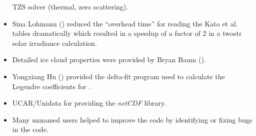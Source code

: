 \begin{itemize}
  TZS solver (thermal, zero scattering).
\item Sina Lohmann () reduced the ``overhead time''
  for reading the Kato et al. tables dramatically which resulted in 
  a speedup of a factor of 2 in a twostr solar irradiance calculation.
\item Detailed ice cloud properties were provided by Bryan Baum
  (). 
\item Yongxiang Hu () provided the delta-fit 
  program used to calculate the Legendre coefficients for .
\item UCAR/Unidata for providing the \emph{netCDF} library.
\item Many unnamed users helped to improve the code by identifying 
  or fixing bugs in the code. 
\end{itemize}



